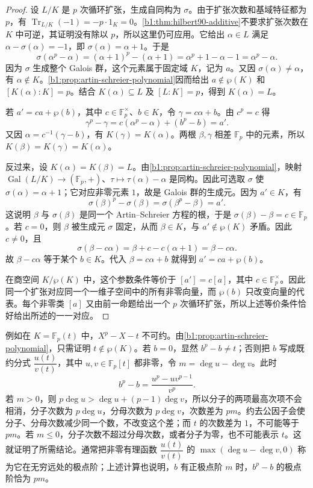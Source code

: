 \begin{proof}
	设 \(L/K\) 是 \(p\) 次循环扩张，生成自同构为 \(\sigma\)。由于扩张次数和基域特征都为 \(p\)，有 \(\operatorname{Tr}_{L/K}(-1)=-p\cdot1_K=0\)。\cref{b1:thm:hilbert90-additive}不要求扩张次数在 \(K\) 中可逆，其证明没有除以 \(p\)，所以这里仍可应用。它给出 \(\alpha\in L\) 满足 \(\alpha-\sigma(\alpha)=-1\)，即 \(\sigma(\alpha)=\alpha+1\)。于是
	\[
		\sigma(\alpha^p-\alpha) =(\alpha+1)^p-(\alpha+1) =\alpha^p+1-\alpha-1 =\alpha^p-\alpha.
	\]
	因为 \(\sigma\) 生成整个 Galois 群，这个元素属于固定域 \(K\)，记为 \(a\)。又因 \(\sigma(\alpha)\neq\alpha\)，有 \(\alpha\notin K\)。\cref{b1:prop:artin-schreier-polynomial}因而给出 \(a\notin\wp(K)\) 和 \([K(\alpha):K]=p\)。结合 \(K(\alpha)\subseteq L\) 及 \([L:K]=p\)，得到 \(K(\alpha)=L\)。

	若 \(a'=ca+\wp(b)\)，其中 \(c\in\mathbb F_p^\times\)、\(b\in K\)，令 \(\gamma=c\alpha+b\)。由 \(c^p=c\) 得
	\[
		\gamma^p-\gamma=c(\alpha^p-\alpha)+(b^p-b)=a'.
	\]
	又因 \(\alpha=c^{-1}(\gamma-b)\)，有 \(K(\gamma)=K(\alpha)\)。两根 \(\beta,\gamma\) 相差 \(\mathbb F_p\) 中的元素，所以 \(K(\beta)=K(\gamma)=K(\alpha)\)。

	反过来，设 \(K(\alpha)=K(\beta)=L\)。由\cref{b1:prop:artin-schreier-polynomial}，映射 \(\operatorname{Gal}(L/K)\to(\mathbb F_p,+)\)、\(\tau\mapsto\tau(\alpha)-\alpha\) 是同构。因此可选取 \(\sigma\) 使 \(\sigma(\alpha)=\alpha+1\)；它对应非零元素 \(1\)，故是 Galois 群的生成元。因为 \(a'\in K\)，有
	\[
		\sigma(\beta)^p-\sigma(\beta)=\sigma(\beta^p-\beta)=a'.
	\]
	这说明 \(\beta\) 与 \(\sigma(\beta)\) 是同一个 Artin--Schreier 方程的根，于是 \(\sigma(\beta)-\beta=c\in\mathbb F_p\)。若 \(c=0\)，则 \(\beta\) 被生成元 \(\sigma\) 固定，从而 \(\beta\in K\)，与 \(a'\notin\wp(K)\) 矛盾。因此 \(c\neq0\)，且
	\[
		\sigma(\beta-c\alpha)=\beta+c-c(\alpha+1)=\beta-c\alpha.
	\]
	故 \(\beta-c\alpha\) 等于某个 \(b\in K\)。代入 \(\beta=c\alpha+b\) 就得到 \(a'=ca+\wp(b)\)。

	在商空间 \(K/\wp(K)\) 中，这个参数条件等价于 \([a']=c[a]\)，其中 \(c\in\mathbb F_p^\times\)。因此同一个扩张对应同一个一维子空间中的所有非零向量，而 \(\wp(b)\) 只改变向量的代表。每个非零类 \([a]\) 又由前一命题给出一个 \(p\) 次循环扩张，所以上述等价条件恰好给出所述的一一对应。
\end{proof}

例如在 \(K=\mathbb F_p(t)\) 中，\(X^p-X-t\) 不可约。由\cref{b1:prop:artin-schreier-polynomial}，只需证明 \(t\notin\wp(K)\)。若 \(b=0\)，显然 \(b^p-b\neq t\)；否则把 \(b\) 写成既约分式 \(\dfrac{u(t)}{v(t)}\)，其中 \(u,v\in\mathbb F_p[t]\) 都非零，令 \(m=\deg u-\deg v\)。此时
\[
	b^p-b=\frac{u^p-uv^{p-1}}{v^p}.
\]
若 \(m>0\)，则 \(p\deg u>\deg u+(p-1)\deg v\)，所以分子的两项最高次项不会相消，分子次数为 \(p\deg u\)，分母次数为 \(p\deg v\)，次数差为 \(pm\)。约去公因子会使分子、分母次数减少同一个数，不改变这个差；而 \(t\) 的次数差为 \(1\)，不可能等于 \(pm\)。若 \(m\le0\)，分子次数不超过分母次数，或者分子为零，也不可能表示 \(t\)。这就证明了所需结论。通常把非零有理函数 \(\dfrac{u(t)}{v(t)}\) 的 \(\max(\deg u-\deg v,0)\) 称为它在无穷远处的极点阶；上述计算也说明，\(b\) 有正极点阶 \(m\) 时，\(b^p-b\) 的极点阶恰为 \(pm\)。

